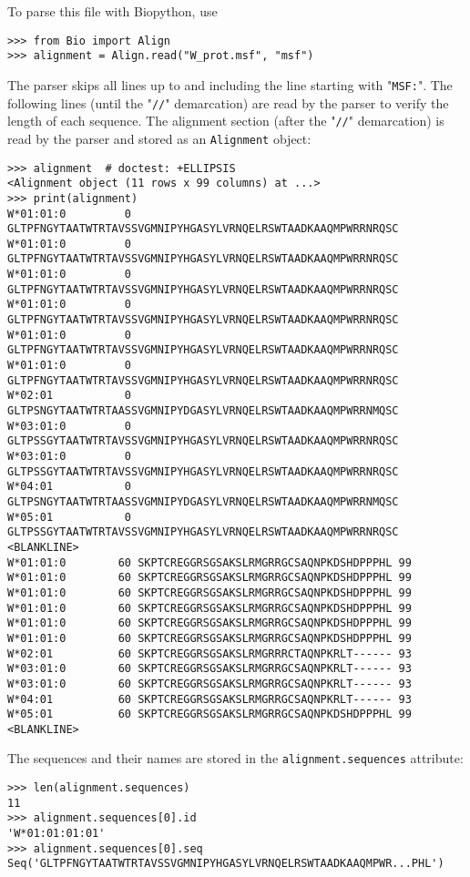 To parse this file with Biopython, use
\begin{verbatim}
>>> from Bio import Align
>>> alignment = Align.read("W_prot.msf", "msf")
\end{verbatim}
The parser skips all lines up to and including the line starting with "\verb|MSF:|". The following lines (until the "\verb|//|" demarcation) are read by the parser to verify the length of each sequence. The alignment section (after the "\verb|//|" demarcation) is read by the parser and stored as an \verb|Alignment| object:
\begin{verbatim}
>>> alignment  # doctest: +ELLIPSIS
<Alignment object (11 rows x 99 columns) at ...>
>>> print(alignment)
W*01:01:0         0 GLTPFNGYTAATWTRTAVSSVGMNIPYHGASYLVRNQELRSWTAADKAAQMPWRRNRQSC
W*01:01:0         0 GLTPFNGYTAATWTRTAVSSVGMNIPYHGASYLVRNQELRSWTAADKAAQMPWRRNRQSC
W*01:01:0         0 GLTPFNGYTAATWTRTAVSSVGMNIPYHGASYLVRNQELRSWTAADKAAQMPWRRNRQSC
W*01:01:0         0 GLTPFNGYTAATWTRTAVSSVGMNIPYHGASYLVRNQELRSWTAADKAAQMPWRRNRQSC
W*01:01:0         0 GLTPFNGYTAATWTRTAVSSVGMNIPYHGASYLVRNQELRSWTAADKAAQMPWRRNRQSC
W*01:01:0         0 GLTPFNGYTAATWTRTAVSSVGMNIPYHGASYLVRNQELRSWTAADKAAQMPWRRNRQSC
W*02:01           0 GLTPSNGYTAATWTRTAASSVGMNIPYDGASYLVRNQELRSWTAADKAAQMPWRRNMQSC
W*03:01:0         0 GLTPSSGYTAATWTRTAVSSVGMNIPYHGASYLVRNQELRSWTAADKAAQMPWRRNRQSC
W*03:01:0         0 GLTPSSGYTAATWTRTAVSSVGMNIPYHGASYLVRNQELRSWTAADKAAQMPWRRNRQSC
W*04:01           0 GLTPSNGYTAATWTRTAASSVGMNIPYDGASYLVRNQELRSWTAADKAAQMPWRRNMQSC
W*05:01           0 GLTPSSGYTAATWTRTAVSSVGMNIPYHGASYLVRNQELRSWTAADKAAQMPWRRNRQSC
<BLANKLINE>
W*01:01:0        60 SKPTCREGGRSGSAKSLRMGRRGCSAQNPKDSHDPPPHL 99
W*01:01:0        60 SKPTCREGGRSGSAKSLRMGRRGCSAQNPKDSHDPPPHL 99
W*01:01:0        60 SKPTCREGGRSGSAKSLRMGRRGCSAQNPKDSHDPPPHL 99
W*01:01:0        60 SKPTCREGGRSGSAKSLRMGRRGCSAQNPKDSHDPPPHL 99
W*01:01:0        60 SKPTCREGGRSGSAKSLRMGRRGCSAQNPKDSHDPPPHL 99
W*01:01:0        60 SKPTCREGGRSGSAKSLRMGRRGCSAQNPKDSHDPPPHL 99
W*02:01          60 SKPTCREGGRSGSAKSLRMGRRRCTAQNPKRLT------ 93
W*03:01:0        60 SKPTCREGGRSGSAKSLRMGRRGCSAQNPKRLT------ 93
W*03:01:0        60 SKPTCREGGRSGSAKSLRMGRRGCSAQNPKRLT------ 93
W*04:01          60 SKPTCREGGRSGSAKSLRMGRRGCSAQNPKRLT------ 93
W*05:01          60 SKPTCREGGRSGSAKSLRMGRRGCSAQNPKDSHDPPPHL 99
<BLANKLINE>
\end{verbatim}
The sequences and their names are stored in the \verb|alignment.sequences| attribute:
\begin{verbatim}
>>> len(alignment.sequences)
11
>>> alignment.sequences[0].id
'W*01:01:01:01'
>>> alignment.sequences[0].seq
Seq('GLTPFNGYTAATWTRTAVSSVGMNIPYHGASYLVRNQELRSWTAADKAAQMPWR...PHL')
\end{verbatim}
